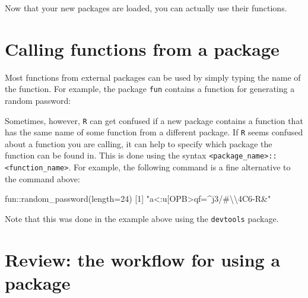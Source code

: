 \documentclass[
]{book}
\newenvironment{Shaded}{\begin{snugshade}}{\end{snugshade}}
\newcommand{\AttributeTok}[1]{\textcolor[rgb]{0.77,0.63,0.00}{#1}}
\newcommand{\DecValTok}[1]{\textcolor[rgb]{0.00,0.00,0.81}{#1}}
\newcommand{\FunctionTok}[1]{\textcolor[rgb]{0.00,0.00,0.00}{#1}}
\newcommand{\NormalTok}[1]{#1}
\newcommand{\SpecialCharTok}[1]{\textcolor[rgb]{0.00,0.00,0.00}{#1}}
\newcommand{\StringTok}[1]{\textcolor[rgb]{0.31,0.60,0.02}{#1}}
\begin{document}
Now that your new packages are loaded, you can actually use their functions.

\hypertarget{calling-functions-from-a-package}{%
\section*{Calling functions from a package}\label{calling-functions-from-a-package}}

Most functions from external packages can be used by simply typing the name of the function. For example, the package \texttt{fun} contains a function for generating a random password:

\begin{Shaded}
\end{Shaded}

Sometimes, however, \texttt{R} can get confused if a new package contains a function that has the same name of some function from a different package. If \texttt{R} seems confused about a function you are calling, it can help to specify which package the function can be found in. This is done using the syntax \texttt{\textless{}package\_name\textgreater{}::\textless{}function\_name\textgreater{}}. For example, the following command is a fine alternative to the command above:

\begin{Shaded}
\begin{Highlighting}[]
\NormalTok{fun}\SpecialCharTok{::}\FunctionTok{random\_password}\NormalTok{(}\AttributeTok{length=}\DecValTok{24}\NormalTok{)}
\NormalTok{[}\DecValTok{1}\NormalTok{] }\StringTok{"a\textless{}:u[OPB\textgreater{}qf=\^{}j3/\#}\SpecialCharTok{\textbackslash{}\textbackslash{}}\StringTok{4C6{-}R\&"}
\end{Highlighting}
\end{Shaded}

Note that this was done in the example above using the \texttt{devtools} package.

\hypertarget{review-the-workflow-for-using-a-package}{%
\section*{Review: the workflow for using a package}\label{review-the-workflow-for-using-a-package}}
\end{document}

